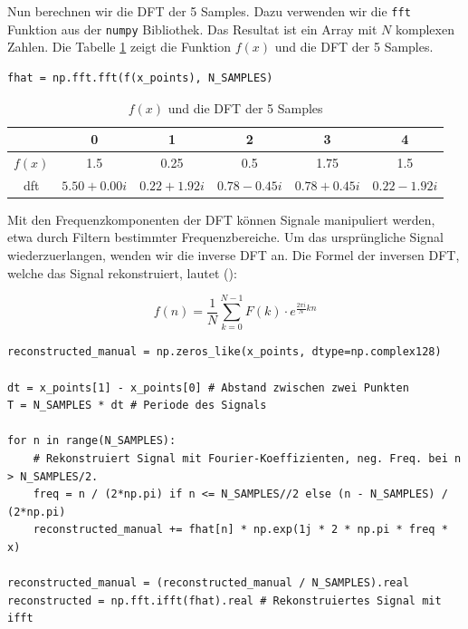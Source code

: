 \documentclass[11pt,a4paper]{article}
\begin{document}
\noindent
Nun berechnen wir die DFT der 5 Samples. Dazu verwenden wir die \texttt{fft} Funktion aus der
\texttt{numpy} Bibliothek. Das Resultat ist ein Array mit \(N\) komplexen Zahlen. Die Tabelle
\ref{tab:dft_example_table} zeigt die Funktion \(f(x)\) und die DFT der 5 Samples.

\begin{lstlisting}
fhat = np.fft.fft(f(x_points), N_SAMPLES)
\end{lstlisting}

\begin{table}[h]
	\centering
	\begin{tabular}{|c|c|c|c|c|c|}
		\hline
		         & 0                & 1                & 2                & 3                & 4                \\
		\hline
		\(f(x)\) & 1.5              & 0.25             & 0.5              & 1.75             & 1.5              \\
		\hline
		dft      & \(5.50 + 0.00i\) & \(0.22 + 1.92i\) & \(0.78 - 0.45i\) & \(0.78 + 0.45i\) & \(0.22 - 1.92i\) \\
		\hline
	\end{tabular}
	\caption{\(f(x)\) und die DFT der 5 Samples}
	\label{tab:dft_example_table}
\end{table}

\noindent
Mit den Frequenzkomponenten der DFT können Signale manipuliert werden, etwa durch Filtern
bestimmter Frequenzbereiche. Um das ursprüngliche Signal wiederzuerlangen, wenden wir die inverse
DFT an. Die Formel der inversen DFT, welche das Signal rekonstruiert, lautet
(\cite[Chapter~3]{hansen2014fourier}):


\[
	f(n) = \frac{1}{N} \sum_{k=0}^{N-1} F(k) \cdot e^{\frac{2\pi i}{N} kn}
\]

\begin{lstlisting}
reconstructed_manual = np.zeros_like(x_points, dtype=np.complex128)

dt = x_points[1] - x_points[0] # Abstand zwischen zwei Punkten
T = N_SAMPLES * dt # Periode des Signals

for n in range(N_SAMPLES):
    # Rekonstruiert Signal mit Fourier-Koeffizienten, neg. Freq. bei n > N_SAMPLES/2.
    freq = n / (2*np.pi) if n <= N_SAMPLES//2 else (n - N_SAMPLES) / (2*np.pi)
    reconstructed_manual += fhat[n] * np.exp(1j * 2 * np.pi * freq * x)

reconstructed_manual = (reconstructed_manual / N_SAMPLES).real
reconstructed = np.fft.ifft(fhat).real # Rekonstruiertes Signal mit ifft
\end{lstlisting}
\end{document}

